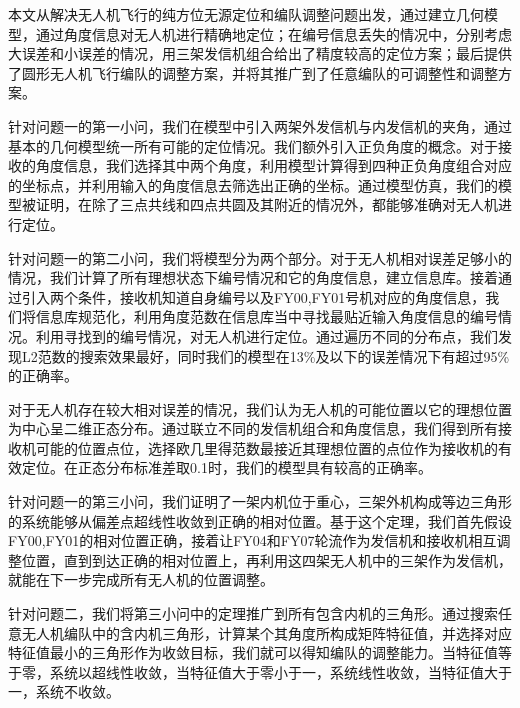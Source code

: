 \documentclass{my_paper}
\begin{document}
\newpage

\begin{center}
\lunwenbiaoti

\vspace{2ex}
\zhaiyao
\end{center}

本文从解决无人机飞行的纯方位无源定位和编队调整问题出发，通过建立几何模型，通过角度信息对无人机进行精确地定位；在编号信息丢失的情况中，分别考虑大误差和小误差的情况，用三架发信机组合给出了精度较高的定位方案；最后提供了圆形无人机飞行编队的调整方案，并将其推广到了任意编队的可调整性和调整方案。

针对问题一的第一小问，我们在模型中引入两架外发信机与内发信机的夹角，通过基本的几何模型统一所有可能的定位情况。我们额外引入正负角度的概念。对于接收的角度信息，我们选择其中两个角度，利用模型计算得到四种正负角度组合对应的坐标点，并利用输入的角度信息去筛选出正确的坐标。通过模型仿真，我们的模型被证明，在除了三点共线和四点共圆及其附近的情况外，都能够准确对无人机进行定位。

针对问题一的第二小问，我们将模型分为两个部分。对于无人机相对误差足够小的情况，我们计算了所有理想状态下编号情况和它的角度信息，建立信息库。接着通过引入两个条件，接收机知道自身编号以及FY00,FY01号机对应的角度信息，我们将信息库规范化，利用角度范数在信息库当中寻找最贴近输入角度信息的编号情况。利用寻找到的编号情况，对无人机进行定位。通过遍历不同的分布点，我们发现L2范数的搜索效果最好，同时我们的模型在13\%及以下的误差情况下有超过95\%的正确率。

对于无人机存在较大相对误差的情况，我们认为无人机的可能位置以它的理想位置为中心呈二维正态分布。通过联立不同的发信机组合和角度信息，我们得到所有接收机可能的位置点位，选择欧几里得范数最接近其理想位置的点位作为接收机的有效定位。在正态分布标准差取0.1时，我们的模型具有较高的正确率。

针对问题一的第三小问，我们证明了一架内机位于重心，三架外机构成等边三角形的系统能够从偏差点超线性收敛到正确的相对位置。基于这个定理，我们首先假设FY00,FY01的相对位置正确，接着让FY04和FY07轮流作为发信机和接收机相互调整位置，直到到达正确的相对位置上，再利用这四架无人机中的三架作为发信机，就能在下一步完成所有无人机的位置调整。

针对问题二，我们将第三小问中的定理推广到所有包含内机的三角形。通过搜索任意无人机编队中的含内机三角形，计算某个其角度所构成矩阵特征值，并选择对应特征值最小的三角形作为收敛目标，我们就可以得知编队的调整能力。当特征值等于零，系统以超线性收敛，当特征值大于零小于一，系统线性收敛，当特征值大于一，系统不收敛。
\end{document}
